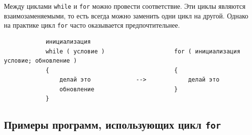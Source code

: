 \documentclass{article}
\begin{document}
\noindent Между циклами \texttt{while} и \texttt{for} можно провести соответствие. Эти циклы являются взаимозаменяемыми, то есть всегда можно заменить одни цикл на другой. Однако на практике цикл \texttt{for} часто оказывается предпочтительнее.
\begin{lstlisting}
            инициализация
            while ( условие )                    for ( инициализация  условие; обновление )
            {                                    {        
                делай это             -->            делай это                       
                обновление                       }                     
            }                                  
\end{lstlisting}

\subsection*{Примеры программ, использующих цикл \texttt{for}}
\end{document}

